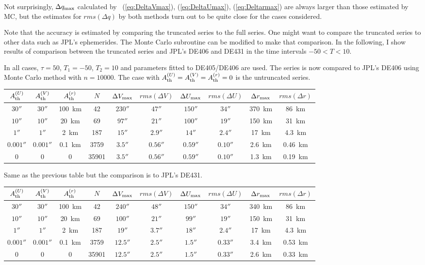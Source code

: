 \documentclass[12pt]{article}
\begin{document}
\vskip 0.5cm
Not surprisingly, $\Delta q_{\rm max}$ calculated by ~(\ref{eq:DeltaVmax}),
(\ref{eq:DeltaUmax}), (\ref{eq:Deltarmax}) are always larger than those estimated by 
MC, but the estimates for $rms(\Delta q)$ by both methods turn out to be quite 
close for the cases considered.

Note that the accuracy is estimated by comparing the truncated series to 
the full series. One might want to compare the truncated series to other 
data such as JPL's ephemerides. The Monte Carlo subroutine can be modified 
to make that comparison. 
In the following, I show results of comparison between the truncated series and 
JPL's DE406 and DE431 in the time intervals $-50 < T <10$. 

\vskip 0.5cm
In all cases, $\tau=50$, $T_1=-50$, $T_2=10$ and parameters fitted to DE405/DE406 are
used. The series is now compared to JPL's DE406 using Monte Carlo method with 
$n=10000$. The case with $A_{\rm th}^{(U)}=A_{\rm th}^{(V)}=A_{\rm th}^{(r)}=0$ 
is the untruncated series.

\begin{tabular}{cccccccccc}
\hline
  $A_{\rm th}^{(U)}$ & $A_{\rm th}^{(V)}$ & $A_{\rm th}^{(r)}$ & $N$ &
  $\Delta V_{\rm max}$ & $rms(\Delta V)$ & $\Delta U_{\rm max}$ & $rms(\Delta U)$
  & $\Delta r_{\rm max}$ & $rms(\Delta r)$ \\
\hline
  $30''$ & $30''$ & 100~km & 42 & $230''$ & $47''$ & $150''$ & $34''$ & 370~km &
86~km \\
  $10''$ & $10''$ & 20~km & 69 & $97''$ & $21''$ & $100''$ & $19''$ & 150~km &
31~km \\
  $1''$ & $1''$ & 2~km & 187 & $15''$ & $2.9''$ & $14''$ & $2.4''$ & 17~km &
4.3~km \\
  $0.001''$ & $0.001''$ & 0.1~km & 3759 & $3.5''$ & $0.56''$ & $0.59''$ & $0.10''$ &
  2.6~km & 0.46~km \\
  0 & 0 & 0 & 35901 & $3.5''$ & $0.56''$ & $0.59''$ & $0.10''$ & 1.3~km & 0.19~km \\
\hline
\end{tabular}

\vskip 0.5cm
Same as the previous table but the comparison is to JPL's DE431.

\begin{tabular}{cccccccccc}
\hline
  $A_{\rm th}^{(U)}$ & $A_{\rm th}^{(V)}$ & $A_{\rm th}^{(r)}$ & $N$ &
  $\Delta V_{\rm max}$ & $rms(\Delta V)$ & $\Delta U_{\rm max}$ & $rms(\Delta U)$
  & $\Delta r_{\rm max}$ & $rms(\Delta r)$ \\
\hline
  $30''$ & $30''$ & 100~km & 42 & $240''$ & $48''$ & $150''$ & $34''$ & 340~km &
86~km \\
  $10''$ & $10''$ & 20~km & 69 & $100''$ & $21''$ & $99''$ & $19''$ & 150~km &
31~km \\
  $1''$ & $1''$ & 2~km & 187 & $19''$ & $3.7''$ & $18''$ & $2.4''$ & 17~km &
4.3~km \\
  $0.001''$ & $0.001''$ & 0.1~km & 3759 & $12.5''$ & $2.5''$ & $1.5''$ & $0.33''$ &
  3.4~km & 0.53~km \\
  0 & 0 & 0 & 35901 & $12.5''$ & $2.5''$ & $1.5''$ & $0.33''$ &
  2.6~km & 0.33~km \\
\hline
\end{tabular}
\end{document}
